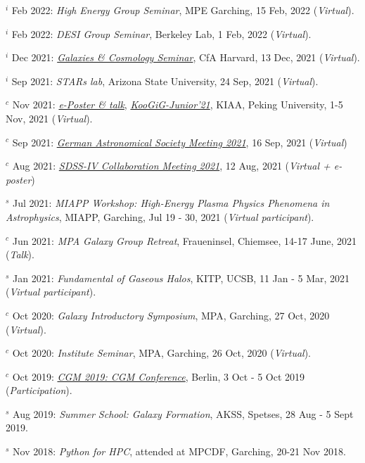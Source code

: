 \documentclass[12pt,letterpaper]{article}
\begin{document}
\begin{list}{}{\cvlist}
\item $^i$ Feb 2022:  \emph{High Energy Group Seminar}, MPE Garching, 15 Feb, 2022 (\textit{Virtual}).
\item $^i$ Feb 2022:  \emph{DESI Group Seminar}, Berkeley Lab, 1 Feb, 2022 (\textit{Virtual}).
\item $^i$ Dec 2021:  \emph{\href{https://pweb.cfa.harvard.edu/calendar/event/9298}{Galaxies \& Cosmology Seminar}}, CfA Harvard, 13 Dec, 2021 (\textit{Virtual}).
\item $^i$ Sep 2021:  \textit{STARs lab}, Arizona State University, 24 Sep, 2021 (\textit{Virtual}).

\item $^c$ Nov 2021:  \emph{\href{https://www.bilibili.com/video/BV1nv411M7w3}{e-Poster \& talk}}, \emph{\href{https://kiaa.pku.edu.cn/KooGig_junior21/Home.htm}{KooGiG-Junior'21}}, KIAA, Peking University, 1-5 Nov, 2021 (\textit{Virtual}).

\item $^c$ Sep 2021:  \emph{\href{https://ag2021.astronomische-gesellschaft.de/view_splinter.php?session=Stars}{German Astronomical Society Meeting 2021}}, 16 Sep, 2021 (\textit{Virtual})
\item $^c$ Aug 2021:  \emph{\href{https://jhu2021.sdss.org/}{SDSS-IV Collaboration Meeting 2021}}, 12 Aug, 2021 (\textit{Virtual + e-poster})
\item $^s$ Jul 2021:  \emph{MIAPP Workshop: High-Energy Plasma Physics Phenomena in Astrophysics}, MIAPP, Garching, Jul 19 - 30, 2021 (\textit{Virtual participant}).

\item $^c$ Jun 2021:  \emph{MPA Galaxy Group Retreat}, Fraueninsel, Chiemsee, 14-17 June, 2021 (\textit{Talk}).
\item $^s$ Jan 2021:  \emph{Fundamental of Gaseous Halos}, KITP, UCSB, 11 Jan - 5 Mar, 2021 (\textit{Virtual participant}).
\item $^c$ Oct 2020:  \emph{Galaxy Introductory Symposium}, MPA, Garching, 27 Oct, 2020 (\textit{Virtual}).
\item $^c$ Oct 2020:  \emph{Institute Seminar}, MPA, Garching, 26 Oct, 2020 (\textit{Virtual}).

\item $^c$ Oct 2019:  \emph{\href{https://wwwmpa.mpa-garching.mpg.de/conf/berlincgm2019/}{CGM 2019: CGM Conference}}, Berlin, 3 Oct - 5 Oct 2019 (\textit{Participation}).
\item $^s$ Aug 2019:  \emph{Summer School: Galaxy Formation}, AKSS, Spetses, 28 Aug - 5 Sept 2019.
\item $^s$ Nov 2018:  \emph{Python for HPC}, attended at MPCDF, Garching, 20-21 Nov 2018.
\end{list}
\end{document}
